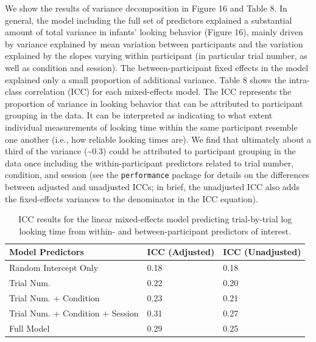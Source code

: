 \documentclass[
  english,
  man, donotrepeattitle,floatsintext]{apa6}
\begin{document}
We show the results of variance decomposition in Figure 16 and Table 8.
In general, the model including the full set of predictors explained a substantial amount of total variance in infants' looking behavior (Figure 16), mainly driven by variance explained by mean variation between participants and the variation explained by the slopes varying within participant (in particular trial number, as well as condition and session).
The between-participant fixed effects in the model explained only a small proportion of additional variance.
Table 8 shows the intra-class correlation (ICC) for each mixed-effects model.
The ICC represents the proportion of variance in looking behavior that can be attributed to participant grouping in the data.
It can be interpreted as indicating to what extent individual measurements of looking time within the same participant resemble one another (i.e., how reliable looking times are).
We find that ultimately about a third of the variance (\textasciitilde0.3) could be attributed to participant grouping in the data once including the within-participant predictors related to trial number, condition, and session (see the \texttt{performance} package for details on the differences between adjusted and unadjusted ICCs; in brief, the unadjusted ICC also adds the fixed-effects variances to the denominator in the ICC equation).

\begin{table}[tbp]

\begin{center}
\begin{threeparttable}

\caption{\label{tab:unnamed-chunk-45}ICC results for the linear mixed-effects model predicting trial-by-trial log looking time from within- and between-participant predictors of interest.}

\begin{tabular}{lll}
\toprule
Model Predictors & \multicolumn{1}{c}{ICC (Adjusted)} & \multicolumn{1}{c}{ICC (Unadjusted)}\\
\midrule
Random Intercept Only & 0.18 & 0.18\\
Trial Num. & 0.22 & 0.20\\
Trial Num. + Condition & 0.23 & 0.21\\
Trial Num. + Condition + Session & 0.31 & 0.27\\
Full Model & 0.29 & 0.25\\
\bottomrule
\end{tabular}

\end{threeparttable}
\end{center}

\end{table}
\end{document}
